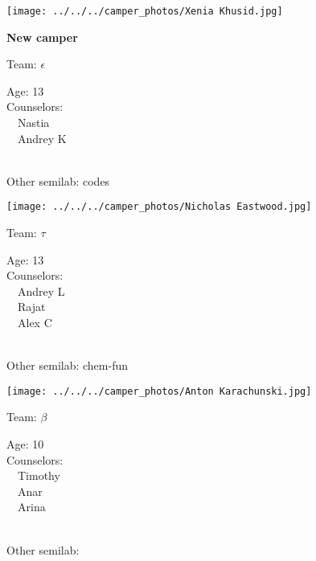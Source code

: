 \documentclass[10pt,letterpaper, landscape]{article}
\begin{document}
\horizontalshiftfornextsticker
\renewcommand{\baselinestretch}{1} \begin{sticker}
\noindent\begin{minipage}{0.5\textwidth}\texttt{[image: ../../../camper\_photos/Xenia Khusid.jpg]}\end{minipage}\begin{minipage}{0.45\textwidth}
\textbf{New camper} 

Team: {\Large $\epsilon$}

Age:        13\\
Counselors: \\\ \ Nastia\\\ \ Andrey K\\
\end{minipage} \\ \vspace{0.07in}
Other semilab: codes
\end{sticker}
\horizontalshiftfornextsticker
\renewcommand{\baselinestretch}{1} \begin{sticker}
\noindent\begin{minipage}{0.5\textwidth}\texttt{[image: ../../../camper\_photos/Nicholas Eastwood.jpg]}\end{minipage}\begin{minipage}{0.45\textwidth}
Team: {\Large $\tau$}

Age:        13\\
Counselors: \\\ \ Andrey L\\\ \ Rajat\\\ \ Alex C\\
\end{minipage} \\ \vspace{0.07in}
Other semilab: chem-fun
\end{sticker}
\horizontalshiftfornextsticker
\renewcommand{\baselinestretch}{1} \begin{sticker}
\noindent\begin{minipage}{0.5\textwidth}\texttt{[image: ../../../camper\_photos/Anton Karachunski.jpg]}\end{minipage}\begin{minipage}{0.45\textwidth}
Team: {\Large $\beta$}

Age:        10\\
Counselors: \\\ \ Timothy\\\ \ Anar\\\ \ Arina\\
\end{minipage} \\ \vspace{0.07in}
Other semilab: 
\end{sticker}
\end{document}
